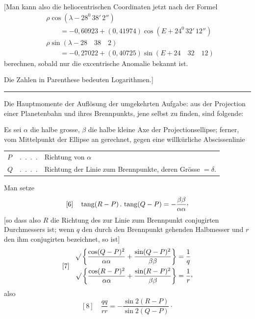 [Man kann also die heliocentrischen Coordinaten jetzt nach der Formel
\[
\begin{aligned}
&\rho\cos(\lambda-28^0\,38'\,2'')\\
&\qquad=-0{,}60923+(0{,}41974)\cos(E+24^0\,32'\,12'')\\
&\rho\sin(\lambda-28\quad38\quad2)\\
&\qquad=-0{,}27022+(0{,}40725)\sin(E+24\quad32\quad12)
\end{aligned}
\]
berechnen, sobald nur die excentrische Anomalie bekannt ist.

Die Zahlen in Parenthese bedeuten Logarithmen.]
\begin{center}\rule{.3\linewidth}{.4pt}\end{center}

Die Hauptmomente der Auflösung der umgekehrten Aufgabe: aus der Projection einer Planetenbahn und ihres Brennpunkts, jene selbst zu finden, sind folgende:

Es sei \(\alpha\) die halbe grosse, \(\beta\) die halbe kleine Axe der Projectionsellipse; ferner, vom Mittelpunkt der Ellipse an gerechnet, gegen eine willkürliche Abscissenlinie
\begin{center}
\begin{tabular}{@{}lcl@{}}
\(P\)&.\ .\ .\ .&Richtung von \(\alpha\)\\
\(Q\)&.\ .\ .\ .&\begin{minipage}[t]{.75\linewidth}Richtung der Linie zum Brennpunkte, deren Grösse \(=\delta\).\end{minipage}
\end{tabular}
\end{center}

Man setze
\[
[6]\quad\operatorname{tang}(R-P)\,.\,\operatorname{tang}(Q-P)
=-\frac{\beta\beta}{\alpha\alpha}\mathpunct{\raisebox{.45ex}{,}}
\]
[so dass also \(R\) die Richtung des zur Linie zum Brennpunkt conjugirten Durchmessers ist; wenn \(q\) den durch den Brennpunkt gehenden Halbmesser und \(r\) den ihm conjugirten bezeichnet, so ist]
\[
[7]\quad\begin{aligned}
\BareRoot{\left\{\frac{\cos(Q-P)^2}{\alpha\alpha}+
\frac{\sin(Q-P)^2}{\beta\beta}\right\}}&=\frac{1}{q}\\
\BareRoot{\left\{\frac{\cos(R-P)^2}{\alpha\alpha}+
\frac{\sin(R-P)^2}{\beta\beta}\right\}}&=\frac{1}{r}\mathpunct{\raisebox{.45ex}{,}}
\end{aligned}
\]
also
\[
[8]\quad\frac{qq}{rr}=-\frac{\sin2(R-P)}{\sin2(Q-P)}\mathpunct{\cdot}
\]

